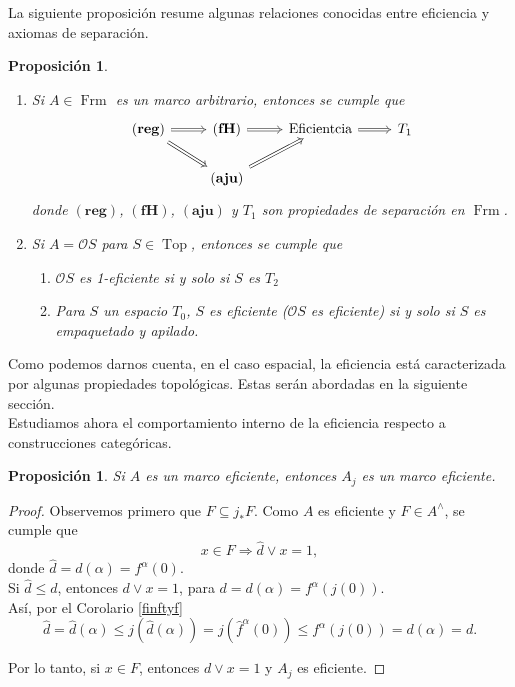 \documentclass[12pt]{article}
\newtheorem{prop}[thm]{Proposición}
\DeclareMathOperator{\Frm}{Frm}
\DeclareMathOperator{\Top}{Top}
\begin{document}
La siguiente proposición resume algunas relaciones conocidas entre eficiencia y axiomas de separación.
\begin{prop}\label{Propiedadeseficientes}
$\mbox{}$
\begin{enumerate}
\item Si $A\in \Frm$ es un marco arbitrario, entonces se cumple que
\[\begin{tikzcd}
	{\mathbf{(reg)}} & {\mathbf{(fH)}} & {\text{Eficientcia}} & {T_1} \\
	& {\mathbf{(aju)}}
	\arrow[Rightarrow, from=1-1, to=1-2]
	\arrow[Rightarrow, from=1-1, to=2-2]
	\arrow[Rightarrow, from=1-2, to=1-3]
	\arrow[Rightarrow, from=1-3, to=1-4]
	\arrow[Rightarrow, from=2-2, to=1-3]
\end{tikzcd}\]
donde $\mathbf{(reg)}$, $\mathbf{(fH)}$, $\mathbf{(aju)}$ y $T_1$ son propiedades de separación en $\Frm$.
\item Si $A=\mathcal{O}S$ para $S\in \Top$, entonces se cumple que
\begin{enumerate}
    \item $\mathcal{O}S$ es 1-eficiente si y solo si $S$ es $T_2$
    \item Para $S$ un espacio $T_0$, $S$ es eficiente ($\mathcal{O}S$ es eficiente) si y solo si $S$ es empaquetado y apilado.
\end{enumerate}
\end{enumerate}
\end{prop}
Como podemos darnos cuenta, en el caso espacial, la eficiencia está caracterizada por algunas propiedades topológicas. Estas serán abordadas en la siguiente sección.\\

Estudiamos ahora el comportamiento interno de la eficiencia respecto a construcciones categóricas. 
\begin{prop}\label{tidyquout}
    Si $A$ es un marco eficiente, entonces $A_j$ es un marco eficiente.
\end{prop}

\begin{proof}
Observemos primero que $F\subseteq j_*F$. Como $A$ es eficiente y $F\in A^\wedge$, se cumple que 
\[
x\in F\Rightarrow \hat{d}\vee x=1,
\]
donde $\hat{d}=d(\alpha)=f^\alpha(0)$.\\

Si $\hat{d}\leq d$, entonces $d\vee x=1$, para $d=d(\alpha)=f^\alpha(j(0))$.\\

Así, por el Corolario \ref{finftyf}
\[
\hat{d}=\hat{d}(\alpha)\leq j(\hat{d}(\alpha))=j(\hat{f}^\alpha(0))\leq f^\alpha(j(0))=d(\alpha)=d.
\]

Por lo tanto, si $x\in F$, entonces $d\vee x=1$ y $A_j$ es eficiente.
\end{proof}
\end{document}
